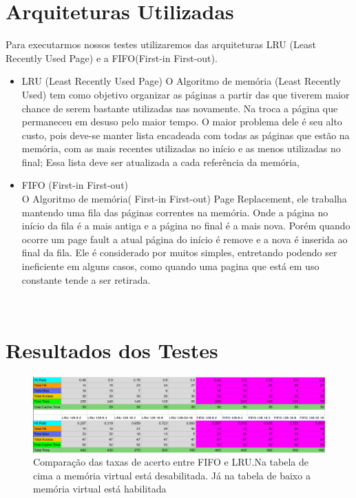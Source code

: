 \documentclass[conference]{IEEEtran}
\begin{document}
\section{Arquiteturas Utilizadas}
 Para executarmos nossos testes utilizaremos das arquiteturas LRU (Least Recently Used Page) e a FIFO(First-in First-out).
\\
\begin{itemize}
\item LRU (Least Recently Used Page)
O Algoritmo de memória (Least Recently Used) tem como objetivo organizar as páginas a partir das que tiverem maior chance de serem bastante utilizadas nas novamente. Na troca a página que permaneceu em desuso pelo maior tempo.  O maior problema dele é seu alto custo, pois deve-se manter lista encadeada com todas as páginas que estão na memória, com as mais recentes utilizadas no início e as menos utilizadas no final; Essa lista deve ser atualizada a cada referência da memória,
\\
\item FIFO (First-in First-out)
\\
O Algoritmo de memória( First-in First-out) Page Replacement, ele trabalha mantendo uma fila das páginas correntes na memória. Onde a página no início da fila é a mais antiga e a página no final é a mais nova. Porém quando ocorre um page fault a atual página do início é remove e a nova é inserida ao final da fila. Ele é considerado por muitos simples, entretando podendo ser ineficiente em alguns casos, como quando uma pagina que está em uso constante tende a ser retirada.

\end{itemize}
\\
\section{Resultados dos Testes}

\begin{figure}[H]
    \includegraphics[width=\linewidth]{Imagens/Tabela.png}
    \caption{Comparação das taxas de acerto entre FIFO e LRU.\break Na tabela de cima a memória virtual está desabilitada. Já na tabela de baixo a memória virtual está habilitada}
    \label{fig:Comparação das taxas de acerto entre FIFO e LRU. Na tabela de cima a memória virtual está desabilitada. Já na tabela de baixo a memória virtual está habilitada}
\end{figure}
\end{document}
